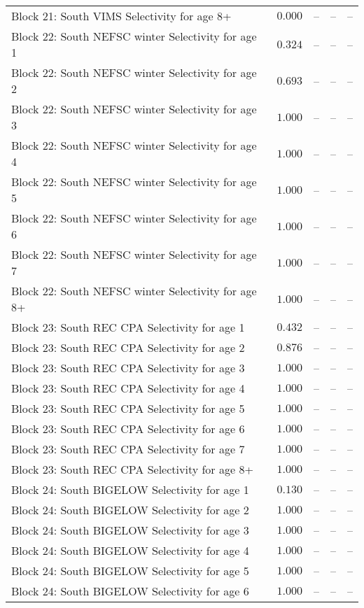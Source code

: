 \documentclass[
]{article}
\begin{document}
\begin{landscape}
\begin{longtable}[t]{lrrrr}
Block 21: South VIMS Selectivity for age 8+ & $0.000$ & -- & -- & --\\
\addlinespace
Block 22: South NEFSC winter Selectivity for age 1 & $0.324$ & -- & -- & --\\
Block 22: South NEFSC winter Selectivity for age 2 & $0.693$ & -- & -- & --\\
Block 22: South NEFSC winter Selectivity for age 3 & $1.000$ & -- & -- & --\\
Block 22: South NEFSC winter Selectivity for age 4 & $1.000$ & -- & -- & --\\
Block 22: South NEFSC winter Selectivity for age 5 & $1.000$ & -- & -- & --\\
\addlinespace
Block 22: South NEFSC winter Selectivity for age 6 & $1.000$ & -- & -- & --\\
Block 22: South NEFSC winter Selectivity for age 7 & $1.000$ & -- & -- & --\\
Block 22: South NEFSC winter Selectivity for age 8+ & $1.000$ & -- & -- & --\\
Block 23: South REC CPA Selectivity for age 1 & $0.432$ & -- & -- & --\\
Block 23: South REC CPA Selectivity for age 2 & $0.876$ & -- & -- & --\\
\addlinespace
Block 23: South REC CPA Selectivity for age 3 & $1.000$ & -- & -- & --\\
Block 23: South REC CPA Selectivity for age 4 & $1.000$ & -- & -- & --\\
Block 23: South REC CPA Selectivity for age 5 & $1.000$ & -- & -- & --\\
Block 23: South REC CPA Selectivity for age 6 & $1.000$ & -- & -- & --\\
Block 23: South REC CPA Selectivity for age 7 & $1.000$ & -- & -- & --\\
\addlinespace
Block 23: South REC CPA Selectivity for age 8+ & $1.000$ & -- & -- & --\\
Block 24: South BIGELOW Selectivity for age 1 & $0.130$ & -- & -- & --\\
Block 24: South BIGELOW Selectivity for age 2 & $1.000$ & -- & -- & --\\
Block 24: South BIGELOW Selectivity for age 3 & $1.000$ & -- & -- & --\\
Block 24: South BIGELOW Selectivity for age 4 & $1.000$ & -- & -- & --\\
\addlinespace
Block 24: South BIGELOW Selectivity for age 5 & $1.000$ & -- & -- & --\\
Block 24: South BIGELOW Selectivity for age 6 & $1.000$ & -- & -- & --\\

\end{longtable}
\end{landscape}
\end{document}
